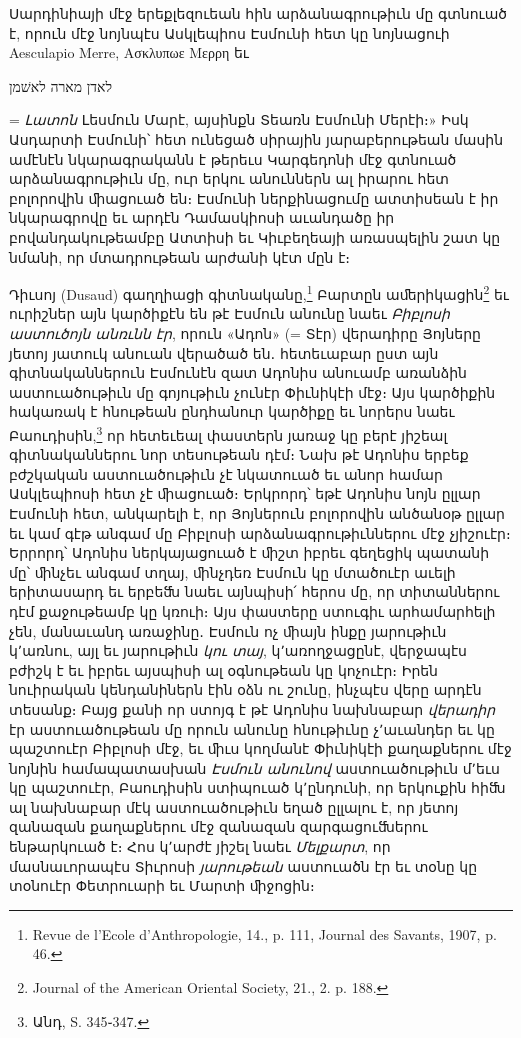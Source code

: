 \documentclass{article}
\begin{document}
{Սարդինիայի մէջ երեքլեզուեան հին արձանագրութիւն մը գտնուած է, որուն մէջ նոյնպէս Ասկլեպիոս Էսմունի հետ կը նոյնացուի Aesculapio Merre, Ασκλυπωε Μερρη եւ \begin{hebrewfont}לאדן מארה לאשׁמן\end{hebrewfont} = \emph{Լատոն} Լեսմուն Մարէ, այսինքն Տեառն Էսմունի Մերէի։» Իսկ Ասդարտի Էսմունի՝ հետ ունեցած սիրային յարաբերութեան մասին ամէնէն նկարագրականն է թերեւս Կարգեդոնի մէջ գտնուած արձանագրութիւն մը, ուր երկու անուններն ալ իրարու հետ բոլորովին ﬕացուած են։ Էսմունի ներքինացումը ատտիսեան է իր նկարագրովը եւ արդէն Դամասկիոսի աւանդածը իր բովանդակութեամբը Ատտիսի եւ Կիւբեղեայի առասպելին շատ կը նմանի, որ մտադրութեան արժանի կէտ մըն է։

Դիւսոյ (Dusaud) գաղղիացի գիտնականը,\footnote{Revue de l'Ecole d'Anthropologie, 14., p. 111, Journal des Savants, 1907, p. 46.} Բարտըն աﬔրիկացին\footnote{Journal of the American Oriental Society, 21., 2. p. 188.} եւ ուրիշներ այն կարծիքէն են թէ Էսմուն անունը նաեւ \emph{Բիբլոսի աստուծոյն անռւնն էր}, որուն «Ադոն» (= Տէր) վերադիրը Յոյները յետոյ յատուկ անուան վերածած են․ հետեւաբար ըստ այն գիտնականներուն Էսմունէն զատ Ադոնիս անուամբ առանձին աստուածութիւն մը գոյութիւն չունէր Փիւնիկէի մէջ։ Այս կարծիքին հակառակ է հնութեան ընդհանուր կարծիքը եւ նորերս նաեւ Բաուդիսին,\footnote{Անդ, S. 345֊347.} որ հետեւեալ փաստերն յառաջ կը բերէ յիշեալ գիտնականներու նոր տեսութեան դէմ։ Նախ թէ Ադոնիս երբեք բժշկական աստուածութիւն չէ նկատուած եւ անոր համար Ասկլեպիոսի հետ չէ ﬕացուած։ Երկրորդ՝ եթէ Ադոնիս նոյն ըլլար Էսմունի հետ, անկարելի է, որ Յոյներուն բոլորովին անծանօթ ըլլար եւ կամ գէթ անգամ մը Բիբլոսի արձանագրութիւններու մէջ չյիշուէր։ Երրորդ՝ Ադոնիս ներկայացուած է ﬕշտ իբրեւ գեղեցիկ պատանի մը՝ ﬕնչեւ անգամ տղայ, ﬕնչդեռ Էսմուն կը մտածուէր աւելի երիտասարդ եւ երբեﬓ նաեւ այնպիսի՛ հերոս մը, որ տիտաններու դէմ քաջութեամբ կը կռուի։ Այս փաստերը ստուգիւ արհամարհելի չեն, մանաւանդ առաջինը․ Էսմուն ոչ ﬕայն ինքը յարութիւն կ՚առնու, այլ եւ յարութիւն \emph{կու տայ}, կ՚առողջացընէ, վերջապէս բժիշկ է եւ իբրեւ այսպիսի ալ օգնութեան կը կոչուէր։ Իրեն նուիրական կենդանիներն էին օձն ու շունը, ինչպէս վերը արդէն տեսանք։ Բայց քանի որ ստոյգ է թէ Ադոնիս նախնաբար \emph{վերադիր} էր աստուածութեան մը որուն անունը հնութիւնը չ՚աւանդեր եւ կը պաշտուէր Բիբլոսի մէջ, եւ ﬕւս կողմանէ Փիւնիկէի քաղաքներու մէջ նոյնին համապատասխան \emph{Էսմուն անունով} աստուածութիւն մ՚եւս կը պաշտուէր, Բաուդիսին ստիպուած կ՚ընդունի, որ երկուքին հիﬓ ալ նախնաբար մէկ աստուածութիւն եղած ըլլալու է, որ յետոյ զանազան քաղաքներու մէջ զանազան զարգացուﬓերու ենթարկուած է։ Հոս կ՚արժէ յիշել նաեւ \emph{Մելքարտ}, որ մասնաւորապէս Տիւրոսի \emph{յարութեան} աստուածն էր եւ տօնը կը տօնուէր Փետրուարի եւ Մարտի ﬕջոցին։

}
\end{document}

